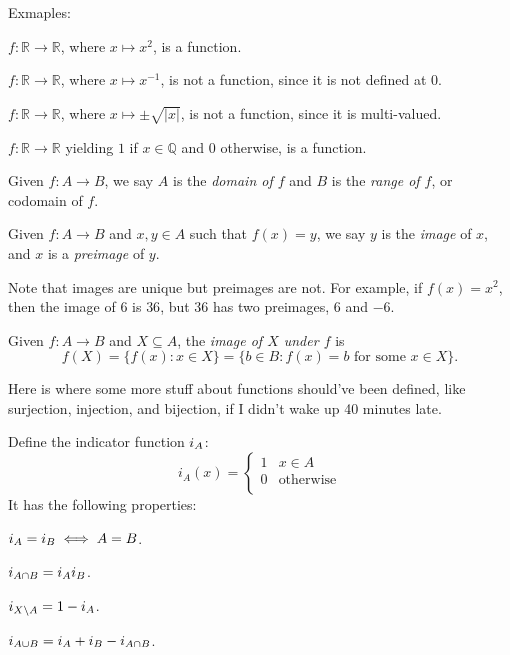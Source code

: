 \documentclass[12pt]{article}
\begin{document}
Exmaples:
\begin{compactenum}[(1)]
\item $f: \mathbb{R} \to \mathbb{R}$, where $x \mapsto x^{2}$, is a function.
\item $f: \mathbb{R} \to \mathbb{R}$, where $x \mapsto x^{-1}$, is not a function, 
    since it is not defined at $0$.
\item $f: \mathbb{R} \to \mathbb{R}$, where $x \mapsto \pm\sqrt{|x|}$, is not a function,
    since it is multi-valued.
\item $f: \mathbb{R} \to \mathbb{R}$ yielding $1$ if $x \in \mathbb{Q}$ and $0$ otherwise,
    is a function.
\end{compactenum}

\begin{definition}
    Given $f: A \to B$, we say $A$ is the \emph{domain of $f$}
    and $B$ is the \emph{range of $f$}, or codomain of $f$.
\end{definition}

\begin{definition}
    Given $f: A \to B$ and $x,y \in A$ such that $f(x) = y$,
    we say $y$ is the \emph{image} of $x$,
    and $x$ is a \emph{preimage} of $y$.
\end{definition}

Note that images are unique but preimages are not. 
For example, if $f(x) = x^{2}$, then
the image of $6$ is $36$, but $36$ has two preimages, $6$ and $-6$.

\begin{definition}
    Given $f: A \to B$ and $X \subseteq A$,
    the \emph{image of $X$ under $f$} is
    \[
        f(X) = \{f(x) : x \in X\} = \{b \in B : f(x) = b \text{ for some } x \in X\}.
    \]
\end{definition}

Here is where some more stuff about functions
should've been defined, like surjection, injection,
and bijection, if I didn't wake up 40 minutes late.

Define the indicator function $i_{A}$:
\[
i_A(x) = \begin{cases}
    1 & x \in A\\
    0 & \text{otherwise}\\
\end{cases}
\]
It has the following properties:
\begin{compactenum}[(i)]
\item $i_{A} = i_{B} \iff A = B$.
\item $i_{A\cap B} = i_{A} i_{B}$.
\item $i_{X\setminus A} = 1 - i_{A}$.
\item $i_{A\cup B} = i_{A} + i_{B} - i_{A \cap B}$.
\end{compactenum}

\end{document}
